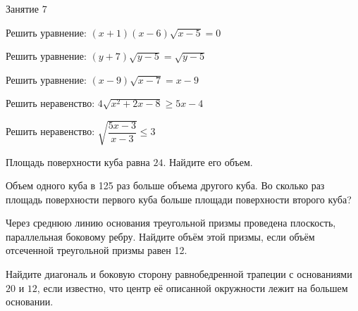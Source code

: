 \begin{class}[number=7]
	\begin{listofex}
		\item Занятие 7
	\end{listofex}
\end{class}

\begin{homework}[number=1]
	\begin{listofex}
		\item Решить уравнение: \( (x+1)(x-6)\sqrt{x-5}=0 \)
		\item Решить уравнение: \( (y+7)\sqrt{y-5}=\sqrt{y-5}\)
		\item Решить уравнение: \( (x-9)\sqrt{x-7}=x-9\)
		\item Решить неравенство: \( 4\sqrt{x^2+2x-8}\ge 5x-4 \)
		\item Решить неравенство: \( \sqrt{\dfrac{5x-3}{x-3}}\le3 \)
		\item Площадь поверхности куба равна \( 24 \). Найдите его объем.
		\item Объем одного куба в 125 раз больше объема другого куба. Во сколько раз площадь поверхности первого куба больше площади поверхности второго куба?
		\item Через среднюю линию основания треугольной призмы проведена плоскость, параллельная боковому ребру. Найдите объём этой призмы, если объём отсеченной треугольной призмы равен 12.
		\item Найдите диагональ и боковую сторону равнобедренной трапеции с основаниями \( 20 \) и \( 12 \), если известно,
		что центр её описанной окружности лежит на большем основании.


\end{listofex}
\end{homework}
